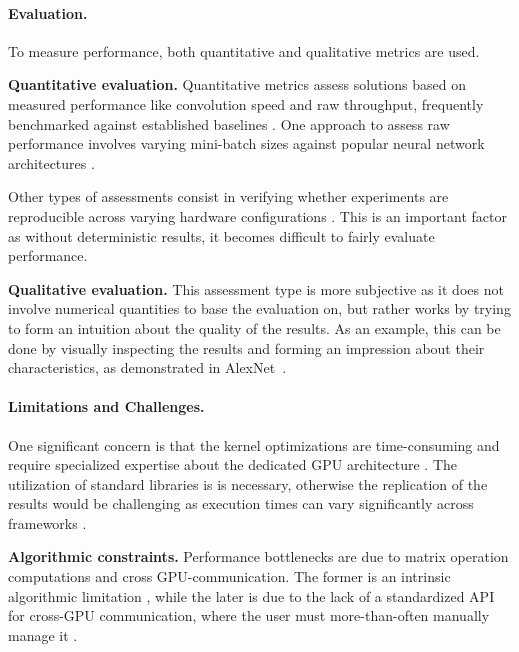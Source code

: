 \paragraph{Evaluation.}
To measure performance, both quantitative and qualitative metrics are used.

\textbf{Quantitative evaluation.}
Quantitative metrics assess solutions based on measured performance like convolution
speed and raw throughput, frequently benchmarked against established baselines
. One approach to assess raw performance involves varying mini-batch sizes
against popular neural network architectures .

Other types of assessments consist in verifying whether experiments are reproducible across varying
hardware configurations . This is an important factor as without
deterministic results, it becomes difficult to fairly evaluate performance.


\textbf{Qualitative evaluation.}
This assessment type is more subjective as it does not involve numerical quantities to base the
evaluation on, but rather works by trying to form an intuition about the quality of the results. As
an example, this can be done by visually inspecting the results and forming an impression about
their characteristics, as demonstrated in AlexNet~.

\paragraph{Limitations and Challenges.}
One significant concern is that the kernel optimizations are time-consuming and require specialized
expertise about the dedicated GPU architecture . The utilization of standard
libraries is is necessary, otherwise the replication of the results would be challenging as
execution times can vary significantly across frameworks .

\textbf{Algorithmic constraints.}
Performance bottlenecks are due to matrix operation computations and cross GPU-communication. The
former is an intrinsic algorithmic limitation , while the later is due to the
lack of a standardized API for cross-GPU communication, where the user must more-than-often
manually manage it .


